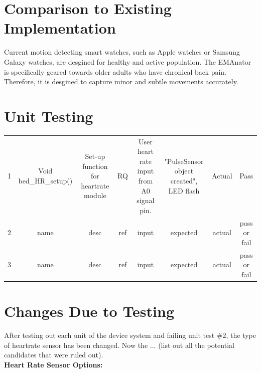 \documentclass[12pt, titlepage]{article}
\begin{document}
\section{Comparison to Existing Implementation}

Current motion detecting smart watches, such as Apple watches or Samsung Galaxy watches, are desgined for healthy and active population. The EMAnator is specifically geared towards older adults who have chronical back pain. Therefore, it is desgined to capture minor and subtle movements accurately.

\section{Unit Testing}

\begin{center}
  \begin{tabular}{ c | c | c | c | c | c | c | c }
    1 & Void bed\_HR\_setup() & Set-up function for heartrate module & RQ  & User heart rate input from A0 signal pin. & "PulseSensor object created", LED flash & Actual & Pass         \\
    2 & name                  & desc                                 & ref & input                                     & expected                                & actual & pass or fail \\
    3 & name                  & desc                                 & ref & input                                     & expected                                & actual & pass or fail \\
  \end{tabular}
\end{center}

\section{Changes Due to Testing}

After testing out each unit of the device system and failing unit test \#2, the type of heartrate sensor has been changed. Now the ... (list out all the potential candidates that were ruled out).\\

\textbf{Heart Rate Sensor Options:}\\
\end{document}
